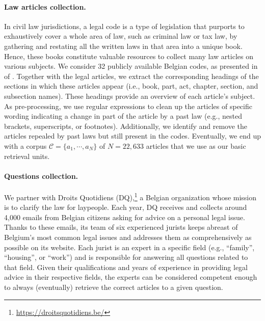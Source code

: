 \documentclass[11pt]{article}
\begin{document}
\paragraph{Law articles collection.}
In civil law jurisdictions, a legal code is a type of legislation that purports to exhaustively cover a whole area of law, such as criminal law or tax law, by gathering and restating all the written laws in that area into a unique book. Hence, these books constitute valuable resources to collect many law articles on various subjects. We consider 32 publicly available Belgian codes, as presented in  of . Together with the legal articles, we extract the corresponding headings of the sections in which these articles appear (i.e., book, part, act, chapter, section, and subsection names). These headings provide an overview of each article’s subject. As pre-processing, we use regular expressions to clean up the articles of specific wording indicating a change in part of the article by a past law (e.g., nested brackets, superscripts, or footnotes). Additionally, we identify and remove the articles repealed by past laws but still present in the codes. Eventually, we end up with a corpus $\mathcal{C} = \{a_1, \cdots, a_N\}$ of $N=22,633$ articles that we use as our basic retrieval units.

\paragraph{Questions collection.}
We partner with Droits Quotidiens (DQ),\footnote{\url{https://droitsquotidiens.be/}} a Belgian organization whose mission is to clarify the law for laypeople. Each year, DQ receives and collects around 4,000 emails from Belgian citizens asking for advice on a personal legal issue. Thanks to these emails, its team of six experienced jurists keeps abreast of Belgium’s most common legal issues and addresses them as comprehensively as possible on its website. Each jurist is an expert in a specific field (e.g., “family”, “housing”, or “work”) and is responsible for answering all questions related to that field. Given their qualifications and years of experience in providing legal advice in their respective fields, the experts can be considered competent enough to always (eventually) retrieve the correct articles to a given question. 
\end{document}
